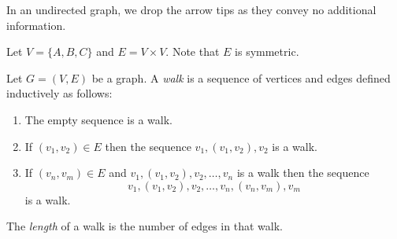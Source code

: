 \documentclass{amsart}
\begin{document}
\para
In an undirected graph, we drop the arrow tips as they convey no additional information.

\begin{eg}
  \label{eg:graphs-example2}
  Let $V = \{A, B, C\}$ and $E = V \times V$.
  Note that $E$ is symmetric.
  \begin{center}
  \end{center}
\end{eg}

\begin{defn}
  \label{defn:walks}
  Let $G = (V,E)$ be a graph.
  A \emph{walk} is a sequence of vertices and edges defined inductively as follows:
  \begin{enumerate}
  \item The empty sequence is a walk.
  \item If $(v_{1},v_{2}) \in E$ then the sequence $v_{1},(v_{1},v_{2}),v_{2}$ is a walk.
  \item If $(v_{n}, v_{m}) \in E$ and $v_{1},(v_{1},v_{2}),v_{2},\ldots,v_{n}$ is a walk then the sequence
    \[
      v_{1},(v_{1},v_{2}),v_{2},\ldots,v_{n},(v_{n},v_{m}),v_{m}
    \]
    is a walk.
  \end{enumerate}
\end{defn}

\begin{defn}
  \label{defn:walks-length}
  The \emph{length} of a walk is the number of edges in that walk.
\end{defn}
\end{document}
